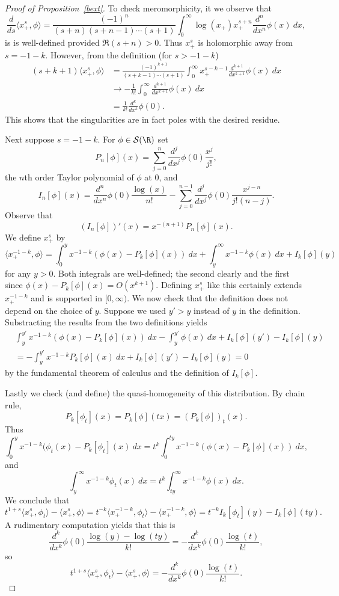 \documentclass[12pt]{article}
\begin{document}
\begin{proof}[Proof of Proposition~\ref{bext}]
To check meromorphicity, it we observe that
\[\frac{d}{ds}\langle x_+^s,\phi\rangle =  \frac{(-1)^n}{(s+n)(s+n-1)\cdots (s+1)}\int_0^\infty \log(x_+)x_+^{s+n}\frac{d^n}{dx^n} \phi(x)\ dx,\] is is well-defined provided $\Re(s+n) > 0$. Thus $x_+^s$ is holomorphic away from $s = -1-k$. However, from the definition (for $s > -1-k$)
\begin{align*}
(s+k+1)\langle x_+^s,\phi\rangle &= \frac{(-1)^{k+1}}{(s+k-1)\cdots (s+1)}\int_0^\infty x_+^{s-k-1}\frac{d^{k+1}}{dx^{k+1}} \phi(x)\ dx\\
&\to -\frac{1}{k!}\int_0^\infty\frac{d^{k+1}}{dx^{k+1}} \phi(x)\ dx\\
&= \frac{1}{k!}\frac{d^k}{dx^k}\phi(0).\end{align*} This shows that the singularities are in fact poles with the desired residue.

Next suppose $s = -1-k$. For $\phi \in \mathcal S(\R)$ set
\[P_n[\phi](x) = \sum_{j=0}^{n} \frac{d^j}{dx^j}\phi (0)\frac{x^j}{j!},\]
the $n$th order Taylor polynomial of $\phi$ at $0$, and
\[I_n[\phi](x) = \frac{d^n}{dx^n}\phi(0) \frac{\log(x)}{n!} - \sum_{j=0}^{n-1} \frac{d^j}{dx^j} \phi(0) \frac{x^{j-n}}{j!(n-j)}.\] Observe that
\[(I_n[\phi])'(x) = x^{-(n+1)}P_n[\phi](x).\] We define $x_+^s$ by
\[\langle x_+^{-1-k},\phi\rangle = \int_0^y x^{-1-k}(\phi(x)-P_k[\phi](x))\ dx + \int_y^\infty x^{-1-k}\phi(x)\ dx + I_k[\phi](y)\]
for any $y > 0$.
Both integrals are well-defined; the second clearly and the first since $\phi(x)-P_k[\phi](x) = O(x^{k+1})$. Defining $x_+^s$ like this certainly extends $x_+^{-1-k}$ and is supported in $[0,\infty)$. We now check that the definition does not depend on the choice of $y$. Suppose we used $y' > y$ instead of $y$ in the definition. Substracting the results from the two definitions yields
\begin{align*}
&\int_y^{y'} x^{-1-k}(\phi(x)-P_k[\phi](x))\ dx - \int_{y}^{y'} \phi(x)\ dx + I_k[\phi](y')-I_k[\phi](y)\\
&=-\int_y^{y'} x^{-1-k}P_k[\phi](x)\ dx + I_k[\phi](y')-I_k[\phi](y) = 0\end{align*}
by the fundamental theorem of calculus and the definition of $I_k[\phi]$.


Lastly we check (and define) the quasi-homogeneity of this distribution. By chain rule,
\[P_k[\phi_t](x) = P_k[\phi](tx) = (P_k[\phi])_t(x).\]
Thus
\[\int_0^y x^{-1-k}(\phi_t(x)-P_k[\phi_t](x)\ dx = t^k\int_0^{ty} x^{-1-k}(\phi(x)-P_k[\phi](x))\ dx,\]
and
\[\int_y^\infty x^{-1-k}\phi_t(x)\ dx = t^k\int_{ty}^\infty x^{-1-k}\phi(x)\ dx.\]
We conclude that
\[t^{1+s}\langle x_+^s,\phi_t\rangle - \langle x_+^{s},\phi\rangle = t^{-k}\langle x_+^{-1-k},\phi_t\rangle- \langle x_+^{-1-k},\phi\rangle = t^{-k}I_k[\phi_t](y) - I_k[\phi](ty).\]
A rudimentary computation yields that this is
\[\frac{d^k}{dx^k}\phi(0)\frac{\log(y)-\log(ty)}{k!} = -\frac{d^k}{dx^k}\phi(0)\frac{\log(t)}{k!},\]
so
\[t^{1+s}\langle x_+^s,\phi_t\rangle - \langle x_+^{s},\phi\rangle = -\frac{d^k}{dx^k}\phi(0)\frac{\log(t)}{k!}.\]


\end{proof}
\end{document}

